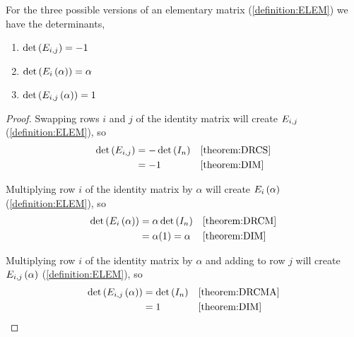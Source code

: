 \documentclass{ximera}
\begin{document}
\begin{theorem}
  \label{theorem:DEM}
  For the three possible versions of an elementary matrix (\ref{definition:ELEM}) we have the determinants,
  \begin{enumerate}
  \item $\det\left(E_{i,j}\right)=-1$
  \item $\det\left(E_{i}\left(\alpha\right)\right)=\alpha$
  \item $\det\left(E_{i,j}\left(\alpha\right)\right)=1$
  \end{enumerate}

  \begin{proof}
    Swapping rows $i$ and $j$ of the identity matrix will create $E_{i,j}$  (\ref{definition:ELEM}), so
    \begin{align*}
      \det\left(E_{i,j}\right)
      &=-\det\left(I_n\right)&&\ref{theorem:DRCS}\\
      &=-1&&\ref{theorem:DIM}\\
    \end{align*}

    Multiplying row $i$ of the identity matrix by $\alpha$ will create $E_{i}\left(\alpha\right)$ (\ref{definition:ELEM}), so
    \begin{align*}
      \det\left(E_{i}\left(\alpha\right)\right)
      &=\alpha\det\left(I_n\right)&&\ref{theorem:DRCM}\\
      &=\alpha(1)=\alpha&&\ref{theorem:DIM}\\
    \end{align*}

    Multiplying row $i$ of the identity matrix by $\alpha$ and adding to row $j$ will create $E_{i,j}\left(\alpha\right)$ (\ref{definition:ELEM}), so
    \begin{align*}
      \det\left(E_{i,j}\left(\alpha\right)\right)
      &=\det\left(I_n\right)&&\ref{theorem:DRCMA}\\
      &=1&&\ref{theorem:DIM}\\
    \end{align*}
    
  \end{proof}
\end{theorem}
\end{document}
